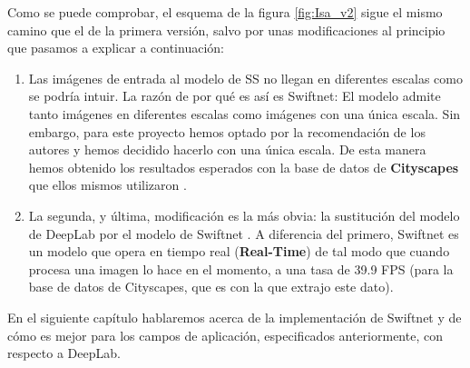 Como se puede comprobar, el esquema de la figura \ref{fig:Isa_v2} sigue el mismo camino que el de la primera versión, salvo por unas modificaciones al principio que pasamos a explicar a continuación:

\begin{enumerate}

\item Las imágenes de entrada al modelo de \ac{SS} no llegan en diferentes escalas como se podría intuir. La razón de por qué es así es Swiftnet: El modelo admite tanto imágenes en diferentes escalas como imágenes con una única escala. Sin embargo, para este proyecto hemos optado por la recomendación de los autores \cite{github_swiftnet} y hemos decidido hacerlo con una única escala. De esta manera hemos obtenido los resultados esperados con la base de datos de \textbf{Cityscapes} \cite{cityscapes} que ellos mismos utilizaron \cite{swiftnet}.

\item La segunda, y última, modificación es la más obvia: la sustitución del modelo de DeepLab \cite{deeplab} por el modelo de Swiftnet \cite{swiftnet}. A diferencia del primero, Swiftnet es un modelo que opera en tiempo real (\textbf{Real-Time}) de tal modo que cuando procesa una imagen lo hace en el momento, a una tasa de 39.9 \ac{FPS} (para la base de datos de Cityscapes, que es con la que extrajo este dato).%

\end{enumerate}


En el siguiente capítulo hablaremos acerca de la implementación de Swiftnet y de cómo es mejor para los campos de aplicación, especificados anteriormente, con respecto a DeepLab.

